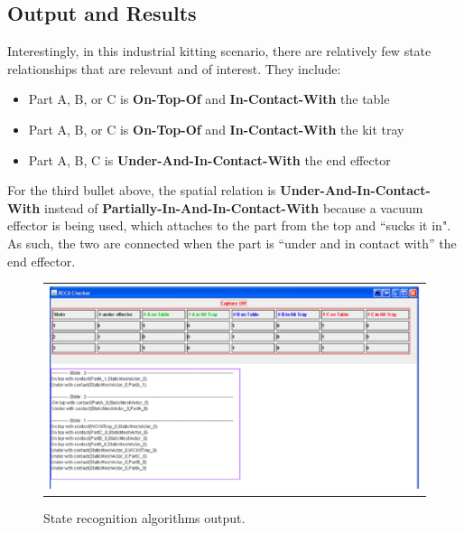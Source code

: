 \documentclass[final,1p,times]{elsarticle}
\newcommand{\sr}[1] {\textbf{#1}}
\begin{document}
\subsection{Output and Results}
Interestingly, in this industrial kitting scenario, there are relatively few state relationships that are relevant and of interest. They include:
\begin{itemize}
 \item Part A, B, or C is \sr{On-Top-Of} and \sr{In-Contact-With} the table
 \item Part A, B, or C is \sr{On-Top-Of} and \sr{In-Contact-With} the kit tray
 \item Part A, B, C is \sr{Under-And-In-Contact-With} the end effector
\end{itemize}

For the third bullet above, the spatial relation is \sr{Under-And-In-Contact-With} instead of \sr{Partially-In-And-In-Contact-With} because a vacuum effector is being used, which attaches to the part from the top and ``sucks it in". As such, the two are connected when the part is ``under and in contact with'' the end effector.

\begin{figure}[h!t!]
\begin{center}
\begin{tabular}{c}
\includegraphics[width=13cm]{checker.eps}
\end{tabular}
\end{center}
\caption{State recognition algorithms output.}
\label{fig:staterecognition}
\end{figure}
\end{document}
